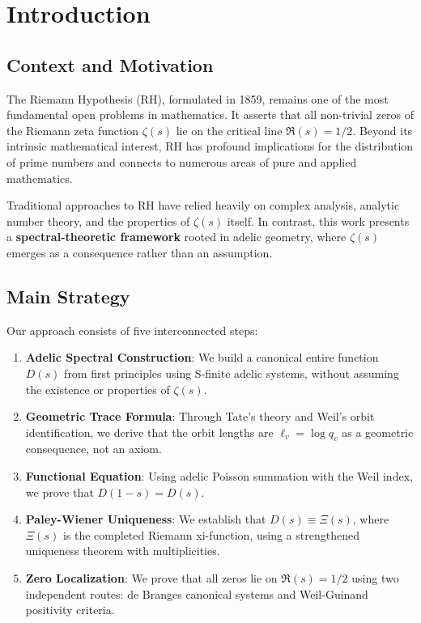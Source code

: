 \section{Introduction}

\subsection{Context and Motivation}

The Riemann Hypothesis (RH), formulated in 1859, remains one of the most fundamental open problems in mathematics. It asserts that all non-trivial zeros of the Riemann zeta function $\zeta(s)$ lie on the critical line $\Re(s) = 1/2$. Beyond its intrinsic mathematical interest, RH has profound implications for the distribution of prime numbers and connects to numerous areas of pure and applied mathematics.

Traditional approaches to RH have relied heavily on complex analysis, analytic number theory, and the properties of $\zeta(s)$ itself. In contrast, this work presents a \textbf{spectral-theoretic framework} rooted in adelic geometry, where $\zeta(s)$ emerges as a consequence rather than an assumption.

\subsection{Main Strategy}

Our approach consists of five interconnected steps:

\begin{enumerate}
  \item \textbf{Adelic Spectral Construction}: We build a canonical entire function $D(s)$ from first principles using S-finite adelic systems, without assuming the existence or properties of $\zeta(s)$.
  
  \item \textbf{Geometric Trace Formula}: Through Tate's theory and Weil's orbit identification, we derive that the orbit lengths are $\ell_v = \log q_v$ as a geometric consequence, not an axiom.
  
  \item \textbf{Functional Equation}: Using adelic Poisson summation with the Weil index, we prove that $D(1-s) = D(s)$.
  
  \item \textbf{Paley-Wiener Uniqueness}: We establish that $D(s) \equiv \Xi(s)$, where $\Xi(s)$ is the completed Riemann xi-function, using a strengthened uniqueness theorem with multiplicities.
  
  \item \textbf{Zero Localization}: We prove that all zeros lie on $\Re(s) = 1/2$ using two independent routes: de Branges canonical systems and Weil-Guinand positivity criteria.
\end{enumerate}

